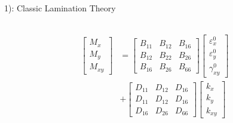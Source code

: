 \documentclass{beamer}
\begin{document}
\begin{frame}{1): Classic Lamination Theory}
\begin{columns}[c]
\begin{column}{0.5\textwidth}
\begin{equation}
\begin{array}{l}
		\begin{aligned}
			\begin{bmatrix}
				M_x \\
				M_y \\
				M_{xy}
			\end{bmatrix}
			&=
			\begin{bmatrix}
				B_{11} & B_{12} & B_{16} \\
				B_{12} & B_{22} & B_{26} \\
				B_{16} & B_{26} & B_{66} 
			\end{bmatrix}
			\begin{bmatrix}
				\varepsilon_x^0 \\
				\varepsilon_y^0 \\
				\gamma_{xy}^0
			\end{bmatrix} \\ 
			&+  
			\begin{bmatrix}
				D_{11} & D_{12} & D_{16} \\
				D_{11} & D_{12} & D_{16} \\
				D_{16} & D_{26} & D_{66} 
			\end{bmatrix}
			\begin{bmatrix}
				k_x \\
				k_y \\
				k_{xy} 
			\end{bmatrix}
		\end{aligned}
			\end{array}
		\end{equation}
	\end{column}
\end{columns}
\end{frame}
\end{document}

